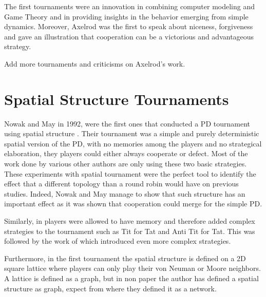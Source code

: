 The first tournaments were an innovation in combining computer modeling and Game
Theory and in providing insights in the behavior emerging from simple dynamics.
Moreover, Axelrod was the first to speak about niceness, forgiveness and gave an
illustration that cooperation can be a victorious and advantageous strategy.

Add more tournaments and criticisms on Axelrod's work.

\section{Spatial Structure Tournaments}

Nowak and May in 1992, were the first ones that conducted a PD tournament using
spatial structure \parencite{Nowak_&_May1992}. Their tournament was a simple and
purely deterministic spatial version of the PD, with no memories among the
players and no strategical elaboration, they players could  either always
cooperate or defect.
Most of the work done by various other authors are only
using these two basic strategies. These experiments with spatial tournament were
the perfect tool to identify the effect that a different topology than a round
robin would have on previous studies.
Indeed, Nowak and May manage to show that
such structure has an important effect as it was shown that cooperation could
merge for the simple PD.

Similarly, in \parencite{Lindgren_&_Nordahl1994} players were allowed to have
memory and therefore added complex strategies to the tournament such as Tit for
Tat and  Anti Tit for Tat. This was followed  by the work of
\parencite{Brauchli_&_Killingback_&_Doebelis1999} which introduced even more
complex strategies.

Furthermore, in the first tournament the spatial structure is defined
on a 2D square lattice where players can only play their von Neuman or Moore neighbors.
A lattice is defined as a graph, but
in non paper the author has defined a spatial structure as graph, expect from
\parencite{Meng&Xia_etc2015} where they defined it as a network.

